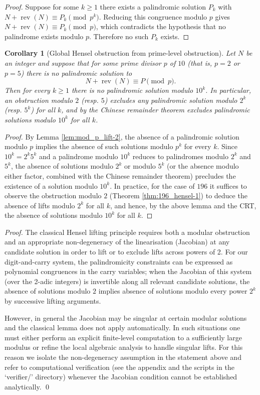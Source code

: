 \documentclass[12pt,a4paper]{article}
\newtheorem{corollary}[theorem]{Corollary}
\begin{document}
\begin{proof}
Suppose for some $k\ge1$ there exists a palindromic solution $P_k$ with
$N+\operatorname{rev}(N)\equiv P_k\pmod{p^k}$. Reducing this congruence modulo $p$ gives
$N+\operatorname{rev}(N)\equiv P_k\pmod p$, which contradicts the hypothesis that no palindrome exists modulo $p$. Therefore no such $P_k$ exists.
\end{proof}

\begin{corollary}[Global Hensel obstruction from prime-level obstruction]\label{cor:prime_to_power-4}
Let $N$ be an integer and suppose that for some prime divisor $p$ of $10$ (that is, $p=2$ or $p=5$) there is no palindromic solution to
$$N+\operatorname{rev}(N)\equiv P\pmod p.$$ 
Then for every $k\ge1$ there is no palindromic solution modulo $10^k$. In particular, an obstruction modulo $2$ (resp. $5$) excludes any palindromic solution modulo $2^k$ (resp. $5^k$) for all $k$, and by the Chinese remainder theorem excludes palindromic solutions modulo $10^k$ for all $k$.
\end{corollary}

\begin{proof}
By Lemma \ref{lem:mod_p_lift-2}, the absence of a palindromic solution modulo $p$ implies the absence of such solutions modulo $p^k$ for every $k$. Since $10^k=2^k5^k$ and a palindrome modulo $10^k$ reduces to palindromes modulo $2^k$ and $5^k$, the absence of solutions modulo $2^k$ or modulo $5^k$ (or the absence modulo either factor, combined with the Chinese remainder theorem) precludes the existence of a solution modulo $10^k$. In practice, for the case of $196$ it suffices to observe the obstruction modulo $2$ (Theorem \ref{thm:196_hensel-1}) to deduce the absence of lifts modulo $2^k$ for all $k$, and hence, by the above lemma and the CRT, the absence of solutions modulo $10^k$ for all $k$.
\end{proof}

\begin{proof}
The classical Hensel lifting principle requires both a modular obstruction and an appropriate non-degeneracy of the linearisation (Jacobian) at any candidate solution in order to lift or to exclude lifts across powers of 2. For our digit-and-carry system, the palindromicity constraints can be expressed as polynomial congruences in the carry variables; when the Jacobian of this system (over the 2-adic integers) is invertible along all relevant candidate solutions, the absence of solutions modulo $2$ implies absence of solutions modulo every power $2^k$ by successive lifting arguments.

However, in general the Jacobian may be singular at certain modular solutions and the classical lemma does not apply automatically. In such situations one must either perform an explicit finite-level computation to a sufficiently large modulus or refine the local algebraic analysis to handle singular lifts. For this reason we isolate the non-degeneracy assumption in the statement above and refer to computational verification (see the appendix and the scripts in the `verifier/' directory) whenever the Jacobian condition cannot be established analytically.
\qed
\end{proof}
\end{document}
